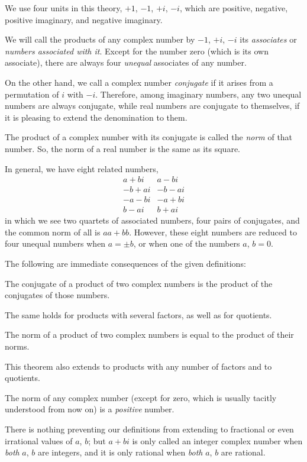 \documentclass[twoside,12pt]{memoir}
\begin{document}
We use four units in this theory, \(+1\), \(-1\), \(+i\), \(-i\), which are positive, negative, positive imaginary, and negative imaginary.
  
We will call the products of any complex number by \(-1\), \(+i\), \(-i\) its \textit{associates} or \textit{numbers associated with it}. Except for the number zero (which is its own associate), there are always four \textit{unequal} associates of any number.

On the other hand, we call a complex number \textit{conjugate} if it arises from a permutation of \(i\) with \(-i\). Therefore, among imaginary numbers, any two unequal numbers are always conjugate, while real numbers are conjugate to themselves, if it is pleasing to extend the denomination to them.
  
The product of a complex number with its conjugate is called the \textit{norm} of that number. So, the norm of a real number is the same as its square.
  
In general, we have eight related numbers, 
\[\begin{array}{r|r}
a+bi & a-bi \\
-b+ai & -b-ai \\
-a-bi & -a+bi \\
b-ai & b+ai
\end{array}\]
in which we see two quartets of associated numbers, four pairs of conjugates, and the common norm of all is \(a a+b b\).  However, these eight numbers are reduced to four unequal numbers when \(a= \pm b\), or when one of the numbers \(a\), \(b=0\).
  
The following are immediate consequences of the given definitions:

The conjugate of a product of two complex numbers is the product of the conjugates of those numbers.

The same holds for products with several factors, as well as for quotients.

The norm of a product of two complex numbers is equal to the product of their norms.

This theorem also extends to products with any number of factors and to quotients.
  
The norm of any complex number (except for zero, which is usually tacitly understood from now on) is a \textit{positive} number.
  
There is nothing preventing our definitions from extending to fractional or even irrational values of \(a\), \(b\); but \(a+bi\) is only called an integer complex number when \textit{both} \(a\), \(b\) are integers, and it is only rational when \textit{both} \(a\), \(b\) are rational.
%
\end{document}

